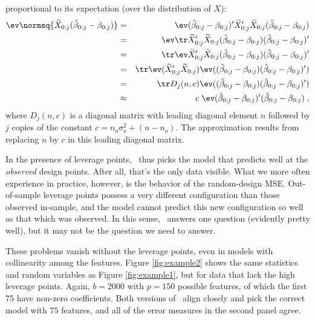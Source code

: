 \documentclass[12pt]{article}
\begin{document}
 proportional to its expectation (over the distribution of $X$):
 \begin{eqnarray}
  \ev \normsq{\widetilde{X}_{0:j}(\hat\beta_{0:j} - \beta_{0:j})}
   &=& \ev (\hat\beta_{0:j} - \beta_{0:j})' \widetilde{X}_{0:j}' 
            \widetilde{X}_{0:j} (\hat\beta_{0:j} - \beta_{0:j}) \cr
   &=& \ev \tr \widetilde{X}_{0:j}'\widetilde{X}_{0:j} 
           (\hat\beta_{0:j} - \beta_{0:j}) (\hat\beta_{0:j} - \beta_{0:j})' \cr
   &=& \tr \ev \widetilde{X}_{0:j}'\widetilde{X}_{0:j} 
           (\hat\beta_{0:j} - \beta_{0:j}) (\hat\beta_{0:j} - \beta_{0:j})' \cr
   &=& \tr \ev (\widetilde{X}_{0:j}'\widetilde{X}_{0:j})
           \ev ((\hat\beta_{0:j} - \beta_{0:j})(\hat\beta_{0:j} - \beta_{0:j})') \cr
   &=& \tr D_j(n,c) 
           \ev ((\hat\beta_{0:j} - \beta_{0:j})(\hat\beta_{0:j} - \beta_{0:j})') \cr
   &\approx& c \; 
           \ev (\hat\beta_{0:j} - \beta_{0:j})'(\hat\beta_{0:j} - \beta_{0:j})\;,
 \end{eqnarray}
 where $D_j(n,c)$ is a diagonal matrix with leading diagonal element $n$
 followed by $j$ copies of the constant $c = n_o \sigma_o^2 + (n - n_o)$.  The
 approximation results from replacing $n$ by $c$ in this leading diagonal
 matrix.

 
 In the presence of leverage points, \aic\ thus picks the model that predicts
 well at the {\em observed} design points.  After all, that's the only data
 visible.  What we more often experience in practice, however, is the behavior
 of the random-design MSE.  Out-of-sample leverage points possess a very
 different configuration than those observed in-sample, and the model cannot
 predict this new configuration so well as that which was observed.  In this
 sense, \aic\ answers one question (evidently pretty well), but it may not be
 the question we need to answer.


 These problems vanish without the leverage points, even in models with
 collinearity among the features.  Figure \ref{fig:example2} shows the same
 statistics and random variables as Figure \ref{fig:example1}, but for data that
 lack the high leverage points. Again, $b=2000$ with $p=150$ possible features,
 of which the first 75 have non-zero coefficients.  Both versions of \aic\ align
 closely and pick the correct model with $75$ features, and all of the error
 measures in the second panel agree.
\end{document}
